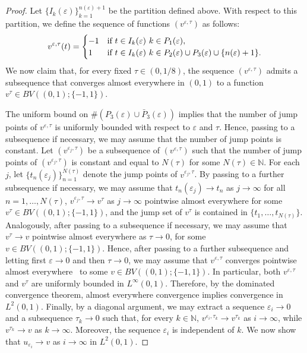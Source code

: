 \documentclass[12pt]{article}
\newcommand{\N}{\mathbb{N}}
\numberwithin{equation}{section}
\def\N{\mathbb N}
\begin{document}
\begin{proof}
Let $\{I_{k}(\varepsilon)\}_{k=1}^{n(\varepsilon)+1}$ be the partition defined above. With respect to this partition, we define the sequence of functions $(v^{\varepsilon,\tau})$ as follows:
\begin{equation*}
v^{\varepsilon,\tau}(t) =
\begin{cases}
-1 & \hbox{if}\,\, t \in I_{k}({\varepsilon})\,\, k \in P_{1}(\varepsilon), \\
1 & \hbox{if}\,\, t \in I_{k}({\varepsilon})\,\, k \in P_{2}(\varepsilon)\cup P_{3}(\varepsilon)\cup\{n(\varepsilon)+1\}.
\end{cases}
\end{equation*}
We now claim that, for every fixed $\tau \in (0,1/8)$, the sequence $(v^{\varepsilon,\tau})$ admits a subsequence that converges almost everywhere in $(0,1)$ to a function $v^{\tau}\in BV((0,1);\{-1,1\})$.

The uniform bound on $\#(P_{3}(\varepsilon)\cup \bar{P}_{3}(\varepsilon))$ implies that the number of jump points of $v^{\varepsilon,\tau}$ is uniformly bounded with respect to $\varepsilon$ and $\tau$. Hence, passing to a subsequence if necessary, we may assume that the number of jump points is constant. Let $(v^{\varepsilon_{j},\tau})$ be a subsequence of $(v^{\varepsilon,\tau})$ such that the number of jump points of $(v^{\varepsilon_{j},\tau})$ is constant and equal to $N({\tau})$ for some $N({\tau}) \in \mathbb{N}$. For each $j$, let $\{t_n(\varepsilon_j)\}_{n=1}^{N(\tau)}$ denote the jump points of $v^{\varepsilon_j,\tau}$. By passing to a further subsequence if necessary, we may assume that
$t_n(\varepsilon_j)\to t_n$ as $j\to\infty$ for all $n=1,\ldots,N(\tau)$, $v^{\varepsilon_j,\tau}\to v^{\tau}$ as $j\to\infty$ pointwise almost everywhere for some $v^{\tau}\in BV((0,1);\{-1,1\})$, and the jump set of $v^{\tau}$ is contained in $\{t_1,\ldots,t_{N(\tau)}\}$. 
Analogously, after passing to a subsequence if necessary, we may assume that $v^{\tau}\to v$ pointwise almost everywhere as $\tau\to 0$, for some $v\in BV((0,1);\{-1,1\})$. Hence, after passing to a further subsequence and letting first $\varepsilon\to0$ and then $\tau\to0$, we may assume that $v^{\varepsilon,\tau}$ converges pointwise almost everywhere \ to some $v \in BV((0,1);\{-1,1\})$. In particular, both $v^{\varepsilon,\tau}$ and $v^{\tau}$ are uniformly bounded in $L^{\infty}(0,1)$. Therefore, by the dominated convergence theorem, almost everywhere convergence implies convergence in $L^{2}(0,1)$. Finally, by a diagonal argument, we may extract a sequence $\varepsilon_i\to0$ and a subsequence $\tau_k\to0$ such that, for every $k\in\N$, $v^{\varepsilon_i,\tau_k}\to v^{\tau_k}$ as $i\to\infty$, while $v^{\tau_k}\to v$ as $k\to\infty$. Moreover, the sequence $\varepsilon_i$ is independent of $k$. We now show that $u_{\varepsilon_i}\to v$ as $i\to\infty$ in $L^{2}(0,1)$.


\end{proof}
\end{document}
